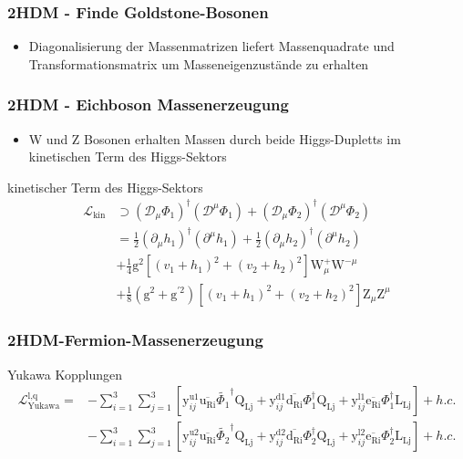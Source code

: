 \documentclass[xcolor=dvipsnames]{beamer}
\begin{document}
\begin{frame}[t]
\frametitle{2HDM - Finde Goldstone-Bosonen}
\begin{itemize}
\item Diagonalisierung der Massenmatrizen liefert Massenquadrate und Transformationsmatrix um Masseneigenzustände zu erhalten
\end{itemize}
\end{frame}
\begin{frame}
\frametitle{2HDM - Eichboson Massenerzeugung}
\begin{itemize}
\item W und Z Bosonen erhalten Massen durch beide Higgs-Dupletts im kinetischen Term des Higgs-Sektors
\end{itemize}
\begin{block}{kinetischer Term des Higgs-Sektors}
\begin{align*}
\mathscr{L}_{\text{kin}} &\supset (\mathscr{D}_{\mu}\Phi_{1})^{\dagger}(\mathscr{D}^{\mu}\Phi_{1})+(\mathscr{D}_{\mu}\Phi_{2})^{\dagger}(\mathscr{D}^{\mu}\Phi_{2}) \\
&= \frac{1}{2} (\partial_{\mu}h_{1})^{\dagger}(\partial^{\mu}h_{1})+\frac{1}{2}(\partial_{\mu}h_{2})^{\dagger}(\partial^{\mu}h_{2}) \\
&+\frac{1}{4} \text{g}^2 [(v_{1}+h_{1})^{2}+(v_{2}+h_{2})^{2}]\text{W}_{\mu}^{+}\text{W}^{-\mu}\\
&+\frac{1}{8} (\text{g}^{2}+\text{g}^{\prime2}) [(v_{1}+h_{1})^{2}+(v_{2}+h_{2})^{2}]\text{Z}_{\mu}\text{Z}^{\mu}
\end{align*}
\end{block}
\end{frame}



\begin{frame}
\frametitle{2HDM-Fermion-Massenerzeugung}
\begin{block}{Yukawa Kopplungen}
\begin{align*}
\mathscr{L}_{\text{Yukawa}}^{\text{l,q}}=&- \sum_{i=1}^{3} \sum_{j=1}^{3} [\text{y}^{\text{u1}}_{ij}\overline{\text{u}_{\text{Ri}}} \tilde{\Phi_{1}}^{\dagger}\text{Q}_{\text{Lj}}+\text{y}^{\text{d1}}_{ij} \overline{\text{d}_{\text{Ri}}}\Phi_{1}^{\dagger} \text{Q}_{\text{Lj}}+\text{y}^{\text{l1}}_{ij} \overline{\text{e}_{\text{Ri}}}\Phi_{1}^{\dagger} \text{L}_{\text{Lj}}]+h.c.\\
&- \sum_{i=1}^{3} \sum_{j=1}^{3} [\text{y}^{\text{u2}}_{ij}\overline{\text{u}_{\text{Ri}}} \tilde{\Phi_{2}}^{\dagger}\text{Q}_{\text{Lj}}+\text{y}^{\text{d2}}_{ij} \overline{\text{d}_{\text{Ri}}}\Phi_{2}^{\dagger} \text{Q}_{\text{Lj}}+\text{y}^{\text{l2}}_{ij} \overline{\text{e}_{\text{Ri}}}\Phi_{2}^{\dagger} \text{L}_{\text{Lj}}]+h.c.
\end{align*}
\end{block}
\end{frame}
\end{document}
